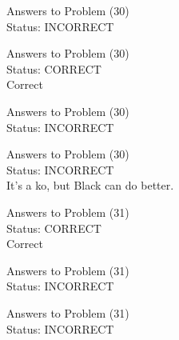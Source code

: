 \documentclass[11pt]{article}
\begin{document}
\begin{minipage}[t]{0.5\textwidth}
  {\centering
  
  Answers to Problem (30)\\
  Status: INCORRECT\\
  
  }
\end{minipage}
\begin{minipage}[t]{0.5\textwidth}
  {\centering
  
  Answers to Problem (30)\\
  Status: CORRECT\\
  Correct\\
  }
\end{minipage}
\begin{minipage}[t]{0.5\textwidth}
  {\centering
  
  Answers to Problem (30)\\
  Status: INCORRECT\\
  
  }
\end{minipage}
\begin{minipage}[t]{0.5\textwidth}
  {\centering
  
  Answers to Problem (30)\\
  Status: INCORRECT\\
  It's a ko, but Black can do better.\\
  }
\end{minipage}
\begin{minipage}[t]{0.5\textwidth}
  {\centering
  
  Answers to Problem (31)\\
  Status: CORRECT\\
  Correct\\
  }
\end{minipage}
\begin{minipage}[t]{0.5\textwidth}
  {\centering
  
  Answers to Problem (31)\\
  Status: INCORRECT\\
  
  }
\end{minipage}
\begin{minipage}[t]{0.5\textwidth}
  {\centering
  
  Answers to Problem (31)\\
  Status: INCORRECT\\
  
  }
\end{minipage}
\end{document}
